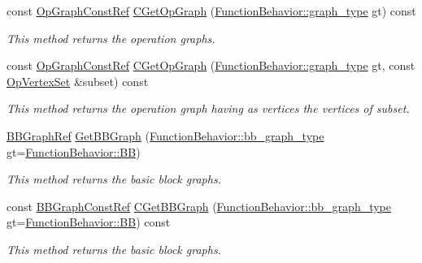 \begin{DoxyCompactItemize}
const \hyperlink{op__graph_8hpp_a9a0b240622c47584bee6951a6f5de746}{Op\+Graph\+Const\+Ref} \hyperlink{classFunctionBehavior_a7c34fbc612df1b924d3b0c02fd71970b}{C\+Get\+Op\+Graph} (\hyperlink{classFunctionBehavior_aed344711ee2798586d99f537b4b7975c}{Function\+Behavior\+::graph\+\_\+type} gt) const
\begin{DoxyCompactList}\small\item\em This method returns the operation graphs. \end{DoxyCompactList}\item 
const \hyperlink{op__graph_8hpp_a9a0b240622c47584bee6951a6f5de746}{Op\+Graph\+Const\+Ref} \hyperlink{classFunctionBehavior_aefb995eb2c159bb42ece11bd62c09852}{C\+Get\+Op\+Graph} (\hyperlink{classFunctionBehavior_aed344711ee2798586d99f537b4b7975c}{Function\+Behavior\+::graph\+\_\+type} gt, const \hyperlink{classOpVertexSet}{Op\+Vertex\+Set} \&subset) const
\begin{DoxyCompactList}\small\item\em This method returns the operation graph having as vertices the vertices of subset. \end{DoxyCompactList}\item 
\hyperlink{basic__block_8hpp_a0e7f233d1b83cad0bfd5aa865f0d3532}{B\+B\+Graph\+Ref} \hyperlink{classFunctionBehavior_aa362616dd57ab7de30f6d1d85c394595}{Get\+B\+B\+Graph} (\hyperlink{classFunctionBehavior_a4e23c056fc0e7e2f677d6e51fcf1fbae}{Function\+Behavior\+::bb\+\_\+graph\+\_\+type} gt=\hyperlink{classFunctionBehavior_a4e23c056fc0e7e2f677d6e51fcf1fbaead78f26de40e6e168db8a5ec624e0a5cc}{Function\+Behavior\+::\+BB})
\begin{DoxyCompactList}\small\item\em This method returns the basic block graphs. \end{DoxyCompactList}\item 
const \hyperlink{basic__block_8hpp_ab66bdbde3a29e41d079d8a320af9c921}{B\+B\+Graph\+Const\+Ref} \hyperlink{classFunctionBehavior_ad95b570908f1a5d7f5b08071c1e49af3}{C\+Get\+B\+B\+Graph} (\hyperlink{classFunctionBehavior_a4e23c056fc0e7e2f677d6e51fcf1fbae}{Function\+Behavior\+::bb\+\_\+graph\+\_\+type} gt=\hyperlink{classFunctionBehavior_a4e23c056fc0e7e2f677d6e51fcf1fbaead78f26de40e6e168db8a5ec624e0a5cc}{Function\+Behavior\+::\+BB}) const
\begin{DoxyCompactList}\small\item\em This method returns the basic block graphs. \end{DoxyCompactList}\item 

\end{DoxyCompactItemize}
